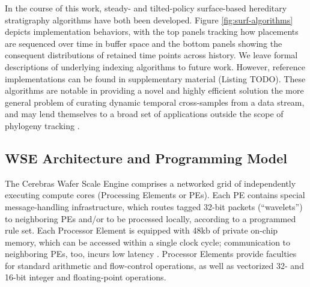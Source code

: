 

In the course of this work, steady- and tilted-policy surface-based hereditary stratigraphy algorithms have both been developed.
Figure \ref{fig:surf-algorithms} depicts implementation behaviors, with the top panels tracking how placements are sequenced over time in buffer space and the bottom panels showing the consequent distributions of retained time points across history.
We leave formal descriptions of underlying indexing algorithms to future work.
However, reference implementations can be found in supplementary material (Listing TODO).
These algorithms are notable in providing a novel and highly efficient solution the more general problem of curating dynamic temporal cross-samples from a data stream, and may lend themselves to a broad set of applications outside the scope of phylogeny tracking \citep{moreno2024algorithms}.




\subsection{WSE Architecture and Programming Model}

The Cerebras Wafer Scale Engine comprises a networked grid of independently executing compute cores (Processing Elements or PEs).
Each PE contains special message-handling infrastructure, which routes tagged 32-bit packets (``wavelets'') to neighboring PEs and/or to be processed locally, according to a programmed rule set.
Each Processor Element is equipped with 48kb of private on-chip memory, which can be accessed within a single clock cycle;
communication to neighboring PEs, too, incurs low latency \citep{buitrago2021neocortex}.
Processor Elements provide faculties for standard arithmetic and flow-control operations, as well as vectorized 32- and 16-bit integer and floating-point operations.

